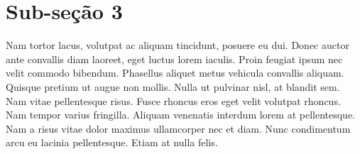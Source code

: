 \documentclass[]{book}
\begin{document}
\hypertarget{sub-seuxe7uxe3o-3-7}{%
\section{Sub-seção 3}\label{sub-seuxe7uxe3o-3-7}}

Nam tortor lacus, volutpat ac aliquam tincidunt, posuere eu dui. Donec auctor ante convallis diam laoreet, eget luctus lorem iaculis. Proin feugiat ipsum nec velit commodo bibendum. Phasellus aliquet metus vehicula convallis aliquam. Quisque pretium ut augue non mollis. Nulla ut pulvinar nisl, at blandit sem. Nam vitae pellentesque risus. Fusce rhoncus eros eget velit volutpat rhoncus. Nam tempor varius fringilla. Aliquam venenatis interdum lorem at pellentesque. Nam a risus vitae dolor maximus ullamcorper nec et diam. Nunc condimentum arcu eu lacinia pellentesque. Etiam at nulla felis.


\end{document}
